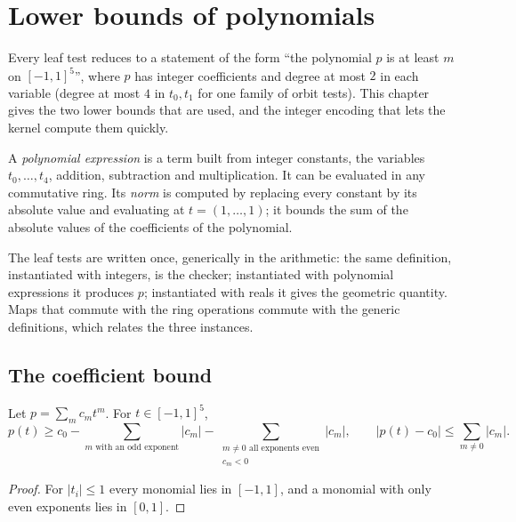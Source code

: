 \chapter{Lower bounds of polynomials}
\label{chap:polybounds}

Every leaf test reduces to a statement of the form ``the polynomial $p$ is at least $m$
on $[-1,1]^5$'', where $p$ has integer coefficients and degree at most $2$ in each
variable (degree at most $4$ in $t_0, t_1$ for one family of orbit tests). This chapter
gives the two lower bounds that are used, and the integer encoding that lets the kernel
compute them quickly.

\begin{definition}
\label{def:pe}
\leanok
A \emph{polynomial expression} is a term built from integer constants, the variables
$t_0, \dots, t_4$, addition, subtraction and multiplication. It can be evaluated in any
commutative ring. Its \emph{norm} is computed by replacing every constant by its
absolute value and evaluating at $t = (1, \dots, 1)$; it bounds the sum of the absolute
values of the coefficients of the polynomial.
\end{definition}

The leaf tests are written once, generically in the arithmetic: the same definition,
instantiated with integers, is the checker; instantiated with polynomial expressions it
produces $p$; instantiated with reals it gives the geometric quantity. Maps that commute
with the ring operations commute with the generic definitions, which relates the three
instances.

\section{The coefficient bound}

\begin{theorem}
\label{thm:coef_bound}
\leanok
{}
Let $p = \sum_m c_m t^m$. For $t \in [-1,1]^5$,
\[
  p(t) \ge c_0 - \sum_{m \text{ with an odd exponent}} |c_m| - \sum_{\substack{m \ne 0 \text{ all exponents even}\\ c_m < 0}} |c_m|,
  \qquad
  |p(t) - c_0| \le \sum_{m \ne 0} |c_m|.
\]
\end{theorem}
\begin{proof}
\leanok
For $|t_i| \le 1$ every monomial lies in $[-1, 1]$, and a monomial with only even
exponents lies in $[0, 1]$.
\end{proof}

